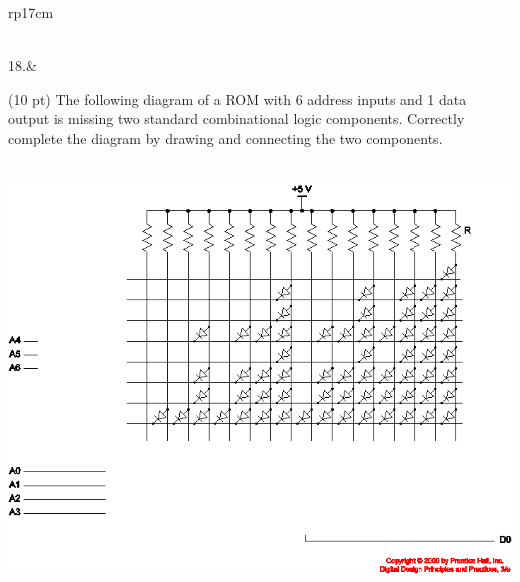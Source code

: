 \documentclass{article}
\begin{document}
\begin{longtable}[l]{rp{17cm}}
\begin{minipage}[t]{\linewidth}
\vspace{4cm
}
\end{minipage}\\
\medskip
18.&\begin{minipage}[t]{\linewidth}(10 pt) The following diagram of a ROM with 6 address inputs and 1 data output is missing two standard combinational logic components.  Correctly complete the diagram by drawing and connecting the two components.\\ \\
\begin{center}
  \includegraphics[scale=0.4]{../Memory/Assessments/ROMStructureMissingParts}
\end{center}

\vspace{4cm
}
\end{minipage}\\
\medskip
\end{longtable}
\end{document}
